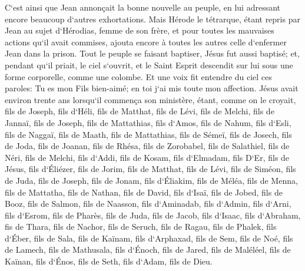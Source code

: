 \verse C`est ainsi que Jean annonçait la bonne nouvelle au peuple, en lui adressant encore beaucoup d`autres exhortations. 
\verse Mais Hérode le tétrarque, étant repris par Jean au sujet d`Hérodias, femme de son frère, et pour toutes les mauvaises actions qu`il avait commises, 
\verse ajouta encore à toutes les autres celle d`enfermer Jean dans la prison. 
\verse Tout le peuple se faisant baptiser, Jésus fut aussi baptisé; et, pendant qu`il priait, le ciel s`ouvrit, 
\verse et le Saint Esprit descendit sur lui sous une forme corporelle, comme une colombe. Et une voix fit entendre du ciel ces paroles: Tu es mon Fils bien-aimé; en toi j`ai mis toute mon affection. 
\verse Jésus avait environ trente ans lorsqu`il commença son ministère, étant, comme on le croyait, fils de Joseph, fils d`Héli, 
\verse fils de Matthat, fils de Lévi, fils de Melchi, fils de Jannaï, fils de Joseph, 
\verse fils de Mattathias, fils d`Amos, fils de Nahum, fils d`Esli, fils de Naggaï, 
\verse fils de Maath, fils de Mattathias, fils de Sémeï, fils de Josech, fils de Joda, 
\verse fils de Joanan, fils de Rhésa, fils de Zorobabel, fils de Salathiel, fils de Néri, 
\verse fils de Melchi, fils d`Addi, fils de Kosam, fils d`Elmadam, fils D`Er, 
\verse fils de Jésus, fils d`Éliézer, fils de Jorim, fils de Matthat, fils de Lévi, 
\verse fils de Siméon, fils de Juda, fils de Joseph, fils de Jonam, fils d`Éliakim, 
\verse fils de Méléa, fils de Menna, fils de Mattatha, fils de Nathan, fils de David, 
\verse fils d`Isaï, fils de Jobed, fils de Booz, fils de Salmon, fils de Naasson, 
\verse fils d`Aminadab, fils d`Admin, fils d`Arni, fils d`Esrom, fils de Pharès, fils de Juda, 
\verse fils de Jacob, fils d`Isaac, fils d`Abraham, fis de Thara, fils de Nachor, 
\verse fils de Seruch, fils de Ragau, fils de Phalek, fils d`Éber, fils de Sala, 
\verse fils de Kaïnam, fils d`Arphaxad, fils de Sem, fils de Noé, fils de Lamech, 
\verse fils de Mathusala, fils d`Énoch, fils de Jared, fils de Maléléel, fils de Kaïnan, 
\verse fils d`Énos, fils de Seth, fils d`Adam, fils de Dieu. 

